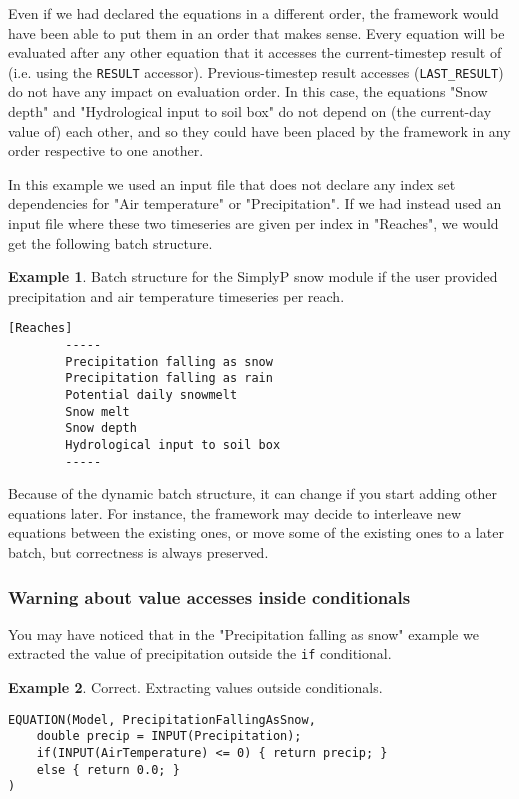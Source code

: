 \documentclass[11pt]{article}
\theoremstyle{definition}
\newtheorem{myexample}{Example}
\newenvironment{example}%
  {\begin{lrbox}{\examplebox}%
   \begin{minipage}{\dimexpr\linewidth-2\fboxsep}
   \begin{myexample}}%
  {\end{myexample}%
   \end{minipage}%
   \end{lrbox}%
   \begin{trivlist}
     \item[]\colorbox{silver}{\usebox\examplebox}
   \end{trivlist}}
\begin{document}
Even if we had declared the equations in a different order, the framework would have been able to put them in an order that makes sense. Every equation will be evaluated after any other equation that it accesses the current-timestep result of (i.e. using the {\tt RESULT} accessor). Previous-timestep result accesses ({\tt LAST\_RESULT}) do not have any impact on evaluation order. In this case, the equations "Snow depth" and "Hydrological input to soil box" do not depend on (the current-day value of) each other, and so they could have been placed by the framework in any order respective to one another.

In this example we used an input file that does not declare any index set dependencies for "Air temperature" or "Precipitation". If we had instead used an input file where these two timeseries are given per index in "Reaches", we would get the following batch structure.

\begin{example}
Batch structure for the SimplyP snow module if the user provided precipitation and air temperature timeseries per reach.
\begin{lstlisting}[style=textstyle]
[Reaches]
        -----
        Precipitation falling as snow
        Precipitation falling as rain
        Potential daily snowmelt
        Snow melt
        Snow depth
        Hydrological input to soil box
        -----
\end{lstlisting}
\end{example}

Because of the dynamic batch structure, it can change if you start adding other equations later. For instance, the framework may decide to interleave new equations between the existing ones, or move some of the existing ones to a later batch, but correctness is always preserved.

\subsubsection{Warning about value accesses inside conditionals}

You may have noticed that in the "Precipitation falling as snow" example we extracted the value of precipitation outside the {\tt if} conditional.

\begin{example}\label{ex:simplypequations}
Correct. Extracting values outside conditionals.
\begin{lstlisting}[style=mycpp]
EQUATION(Model, PrecipitationFallingAsSnow,
	double precip = INPUT(Precipitation);
	if(INPUT(AirTemperature) <= 0) { return precip; }
	else { return 0.0; }
)
\end{lstlisting}
\end{example}
\end{document}
